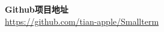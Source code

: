 \documentclass[a4paper]{article}
\begin{document}
 \clearpage
  
\par
\par
\par
\par
\begin{center}
\textbf{Github项目地址} \\
\href{https://github.com/tian-apple/Smallterm}{https://github.com/tian-apple/Smallterm}

\end{center}
\end{document}
